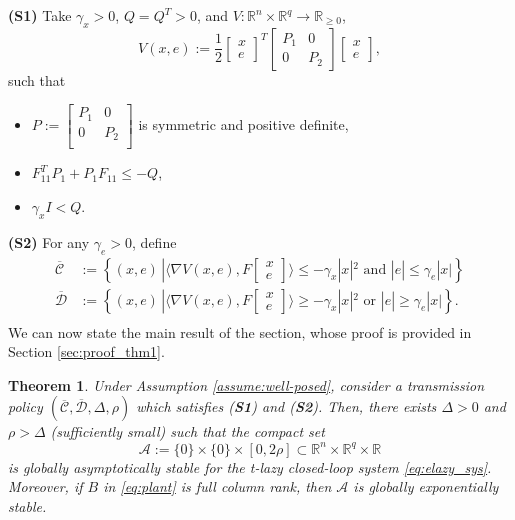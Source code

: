 \documentclass[twocolumn]{autart}
\newtheorem{theorem}{Theorem}
\newcommand{\realn}{\real^n}
\newcommand\real{\ensuremath{{\mathbb R}}}
\newcommand{\setof}[1]{\ensuremath{\left \{ #1 \right \}}}
\newcommand\mymatrix[2]{\left[\begin{array}{#1} #2 \end{array}\right]}
\newcommand{\smallmat}[1]{\left[ \begin{smallmatrix}#1
    \end{smallmatrix} \right]}
\begin{document}
\noindent\textbf{(S1)}
{Take} $\gamma_x>0$, $Q=Q^T>0$, and 
$V:\realn\!\times\!\real^q \!\to\!\real_{\geq 0}$, 
\begin{equation}
 V(x,e) := \frac{1}{2} \mymatrix{c}{x \\ e}^T \mymatrix{cc}{P_1 & 0 \\ 0 & P_2} \mymatrix{c}{x \\ e}, \label{V_fullstate} 
\end{equation}
such that
\begin{itemize}
 \item $P:=\left[
\begin{smallmatrix}
P_1 & 0 \\ 
0 & P_2 \\
\end{smallmatrix}\right]$  is symmetric
and positive definite,
\item $F_{11}^TP_1+P_1F_{11} \leq -Q$,
\item $\gamma_x I< Q$.
\end{itemize}
\textbf{(S2)} For any $\gamma_e>0$, define
\begin{equation}
\label{CD_fullstate}
\begin{array}{ll}
 \overline{\mathcal{C}} &:= \setof{(x,e)\,| 
\langle\nabla V(x,\!e), F\smallmat{x \\ e}\rangle  
\leq -\gamma_x|x|^2 \mbox{ and } |e| \leq \gamma_e |x|} \\
 \overline{\mathcal{D}} &:= \setof{(x,e)\,| 
\langle\nabla V(x,\!e), F\smallmat{x \\ e}\rangle  
\geq -\gamma_x|x|^2 \mbox{ or } |e| \geq \gamma_e |x|}. \\
\end{array} 
\end{equation}
We can now state the main result of the section, whose proof
is provided in Section \ref{sec:proof_thm1}.
\begin{theorem} 
\label{thm:GAS_synchronous}
Under Assumption \ref{assume:well-posed}, 
consider a transmission policy 
$(\overline{\mathcal{C}},\overline{\mathcal{D}},\Delta,\rho)$
which satisfies (\textbf{S1}) and (\textbf{S2}). 
Then, there exists $\Delta>0$ and $\rho>\Delta $ (sufficiently small) 
such that  the compact set 
\begin{equation}
\label{eq:A_sync}
 \mathcal{A} := \{0\}\times \{0\} \times [0,2\rho]
\subset \realn\times\real^q\times\real
\end{equation}
is globally asymptotically stable for the 
t-lazy closed-loop system \eqref{eq:elazy_sys}. Moreover,
if $B$ in \eqref{eq:plant} is full column rank, then 
$\mathcal{A}$ is globally exponentially stable.
\end{theorem}
\end{document}
